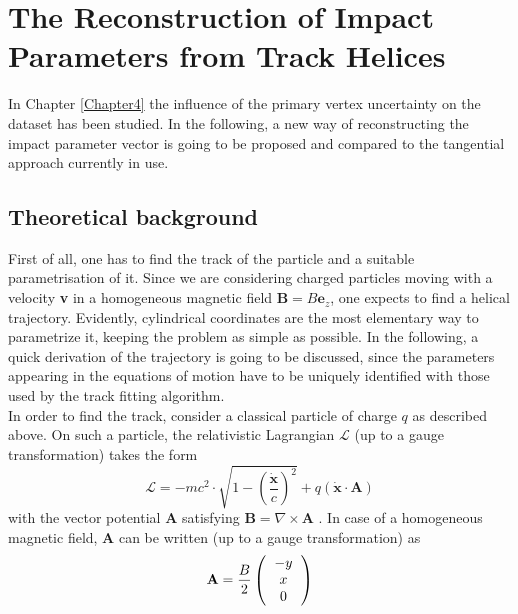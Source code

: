 \chapter{The Reconstruction of Impact Parameters from Track Helices} %

\label{Chapter5} %

In Chapter \ref{Chapter4} the influence of the primary vertex uncertainty on the dataset has been studied. In the following, a new way of reconstructing the impact parameter vector is going to be proposed and compared to the tangential approach \parencite{Claudia_thesis} currently in use.

\section{Theoretical background}
First of all, one has to find the track of the particle and a suitable parametrisation of it. Since we are considering charged particles moving with a velocity \textbf{v} in a homogeneous magnetic field $\boldsymbol{B} = B\boldsymbol{e}_z$, one expects to find a helical trajectory. Evidently, cylindrical coordinates are the most elementary way to parametrize it, keeping the problem as simple as possible. In the following, a quick derivation of the trajectory is going to be discussed, since the parameters appearing in the equations of motion have to be uniquely identified with those used by the track fitting algorithm.\\
In order to find the track, consider a classical particle of charge $q$ as described above. On such a particle, the relativistic Lagrangian $\mathcal{L}$ (up to a gauge transformation) takes the form
\begin{equation}
	\mathcal{L} = -mc^2\cdot\sqrt{1-\left(\frac{\dot{\boldsymbol{x}}}{c}\right)^2}+q(\dot{\boldsymbol{x}}\cdot\mathbf{A})
\end{equation}
with the vector potential $\boldsymbol{A}$ satisfying $\boldsymbol{B} = \nabla \times \mathbf{A}$ \parencite{Jackson}. In case of a homogeneous magnetic field, $\boldsymbol{A}$ can be written (up to a gauge transformation) as
\begin{equation}
	\mathbf{A} = \frac{B}{2}\left(\begin{tabular}{c}
	$-y $\\ 
	$x$\\ 
	$0$
	\end{tabular} \right)
\end{equation}
